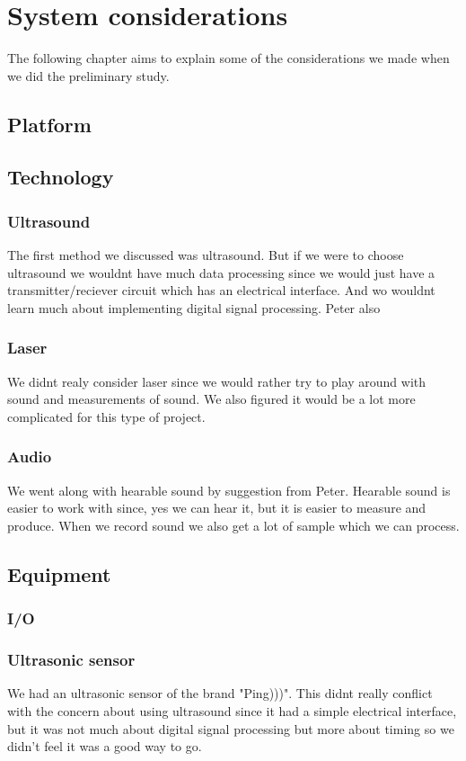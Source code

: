 \chapter{System considerations}
The following chapter aims to explain some of the considerations we made when we did the preliminary study. 
\section{Platform}



\section{Technology}
\subsection{Ultrasound}
The first method we discussed was ultrasound. But if we were to choose ultrasound we wouldnt have much data processing since we would just have a transmitter/reciever circuit which has an electrical interface. And wo wouldnt learn much about implementing digital signal processing. Peter also 

\subsection{Laser}
We didnt realy consider laser since we would rather try to play around with sound and measurements of sound. We also figured it would be a lot more complicated for this type of project.

\subsection{Audio}
We went along with hearable sound by suggestion from Peter. Hearable sound is easier to work with since, yes we can hear it, but it is easier to measure and produce. When we record sound we also get a lot of sample which we can process.

\section{Equipment}
\subsection{I/O}
\subsection{Ultrasonic sensor}
We had an ultrasonic sensor of the brand "Ping)))". This didnt really conflict with the concern about using ultrasound since it had a simple electrical interface, but it was not much about digital signal processing but more about timing so we didn't feel it was a good way to go.
